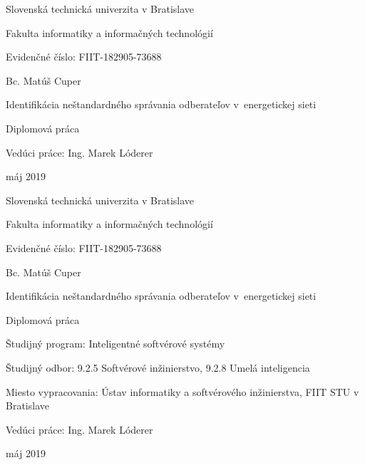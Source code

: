 \documentclass[a4paper,twoside,slovak,12pt,appendix]{article}
\begin{document}
\begin{titlepage}
	\centering
	{\Large Slovenská technická univerzita v Bratislave \par}
	{\Large Fakulta informatiky a informačných technológií \par}
  \vspace{0.5cm}
  {\normalsize Evidenčné číslo: FIIT-182905-73688 \par}
	\vspace{7cm}
  {\large Bc. Matúš Cuper \par}
  \vspace{0.5cm}
	{\LARGE Identifikácia neštandardného správania odberateľov v~energetickej sieti \par}
	\vspace{0.5cm}
	{\large Diplomová práca \par}
	\vspace{7cm}
  \flushleft
	{\large Vedúci práce: Ing. Marek Lóderer \par}
  \vspace{0.5cm}
  {\large máj 2019 \par}
	\vfill
\end{titlepage}
\newpage\null\thispagestyle{empty}\newpage

\begin{titlepage}
	\centering
  {\Large Slovenská technická univerzita v Bratislave \par}
	{\Large Fakulta informatiky a informačných technológií \par}
  \vspace{0.5cm}
  {\normalsize Evidenčné číslo: FIIT-182905-73688 \par}
	\vspace{7cm}
  {\large Bc. Matúš Cuper \par}
  \vspace{0.5cm}
	{\LARGE Identifikácia neštandardného správania odberateľov v~energetickej sieti \par}
	\vspace{0.5cm}
	{\large Diplomová práca \\}
	\vspace{7cm}
  \flushleft
  {\normalsize Študijný program: Inteligentné softvérové systémy \par}
	{\normalsize Študijný odbor: 9.2.5 Softvérové inžinierstvo, 9.2.8 Umelá inteligencia \par}
	{\normalsize Miesto vypracovania: Ústav informatiky a softvérového inžinierstva, FIIT STU v Bratislave \par}
	{\normalsize Vedúci práce: Ing. Marek Lóderer \par}
  \vspace{0.5cm}
  {\normalsize máj 2019 \par}
\end{titlepage}
\newpage\null\thispagestyle{empty}\newpage
\end{document}
